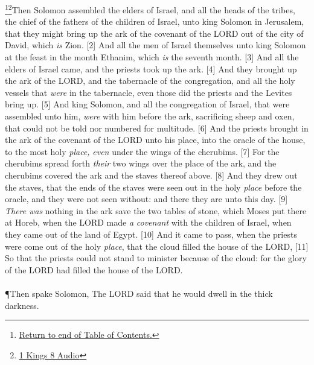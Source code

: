 \footnote{\textcolor[cmyk]{0.99998,1,0,0}{\hyperlink{TOC}{Return to end of Table of Contents.}}}\footnote{\href{https://audiobible.com/bible/1_kings_8.html}{\textcolor[cmyk]{0.99998,1,0,0}{1 Kings 8 Audio}}}\textcolor[cmyk]{0.99998,1,0,0}{Then Solomon assembled the elders of Israel, and all the heads of the tribes, the chief of the fathers of the children of Israel, unto king Solomon in Jerusalem, that they might bring up the ark of the covenant of the LORD out of the city of David, which \emph{is} Zion.}
[2] \textcolor[cmyk]{0.99998,1,0,0}{And all the men of Israel  themselves unto king Solomon at the feast in the month Ethanim, which \emph{is} the seventh month.}
[3] \textcolor[cmyk]{0.99998,1,0,0}{And all the elders of Israel came, and the priests took up the ark.}
[4] \textcolor[cmyk]{0.99998,1,0,0}{And they brought up the ark of the LORD, and the tabernacle of the congregation, and all the holy vessels that \emph{were} in the tabernacle, even those did the priests and the Levites bring up.}
[5] \textcolor[cmyk]{0.99998,1,0,0}{And king Solomon, and all the congregation of Israel, that were assembled unto him, \emph{were} with him before the ark, sacrificing sheep and oxen, that could not be told nor numbered for multitude.}
[6] \textcolor[cmyk]{0.99998,1,0,0}{And the priests brought in the ark of the covenant of the LORD unto his place, into the oracle of the house, to the most holy \emph{place,} \emph{even} under the wings of the cherubims.}
[7] \textcolor[cmyk]{0.99998,1,0,0}{For the cherubims spread forth \emph{their} two wings over the place of the ark, and the cherubims covered the ark and the staves thereof above.}
[8] \textcolor[cmyk]{0.99998,1,0,0}{And they drew out the staves, that the ends of the staves were seen out in the holy \emph{place} before the oracle, and they were not seen without: and there they are unto this day.}
[9] \textcolor[cmyk]{0.99998,1,0,0}{\emph{There} \emph{was} nothing in the ark save the two tables of stone, which Moses put there at Horeb, when the LORD made \emph{a} \emph{covenant} with the children of Israel, when they came out of the land of Egypt.}
[10] \textcolor[cmyk]{0.99998,1,0,0}{And it came to pass, when the priests were come out of the holy \emph{place}, that the cloud filled the house of the LORD,}
[11] \textcolor[cmyk]{0.99998,1,0,0}{So that the priests could not stand to minister because of the cloud: for the glory of the LORD had filled the house of the LORD.}\\
\\
\P \textcolor[cmyk]{0.99998,1,0,0}{Then spake Solomon, The LORD said that he would dwell in the thick darkness.}
